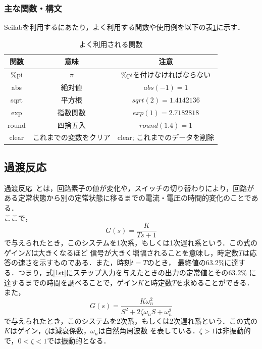 \documentclass[a4paper,11pt]{jsarticle}
\begin{document}
    \subsubsection{主な関数・構文}
    Scilabを利用するにあたり，よく利用する関数や使用例を以下の表\ref{tb:command}に示す．
    \begin{table}[H]
      \centering
      \caption{よく利用される関数}
      \label{tb:command}
      \begin{tabular}{|c|c|c|} \hline
        関数 & 意味 & 注意 \\ \hline 
        \%pi & $\pi$ & \%piを付けなければならない \\ \hline
        abs & 絶対値 & $abs(-1)=1$ \\ \hline
        sqrt & 平方根 & $sqrt(2)=1.4142136$ \\ \hline
        exp & 指数関数 & $exp(1)=2.7182818$ \\ \hline
        round & 四捨五入 & $round(1.4)=1$ \\ \hline
        clear & これまでの変数をクリア & clear; これまでのデータを削除 \\ \hline
      \end{tabular}
    \end{table}
  \subsection{過渡反応}
    過渡反応~\cite{kato}とは，回路素子の値が変化や，スイッチの切り替わりにより，回路が
    ある定常状態から別の定常状態に移るまでの電流・電圧の時間的変化のことである．\\
    ここで，\\
    \begin{equation}
      G(s) = \frac{K}{Ts + 1}
      \label{1st}
    \end{equation}
    で与えられたとき，このシステムを1次系，もしくは1次遅れ系という．この式のゲイン$K$は大きくなるほど
    信号が大きく増幅されることを意味し，時定数$T$は応答の速さを示すものである．また，時刻$t=T$のとき，
    最終値の$63.2\%$に達する．つまり，式\ref{1st}にステップ入力を与えたときの出力の定常値とその$63.2\%$
    に達するまでの時間を調べることで，ゲイン$K$と時定数$T$を求めることができる．\\
    また，\\
    \begin{equation}
      G(s) = \frac{K\omega_n^2}{S^2 + 2\zeta \omega_n S + \omega_n^2}
      \label{2nd}
    \end{equation}
    で与えられたとき，このシステムを2次系，もしくは2次遅れ系という．この式の$K$はゲイン，$\zeta$は減衰係数，$\omega_n$は自然角周波数
    を表している．$\zeta > 1$は非振動的で，$0 < \zeta < 1$では振動的となる．
\end{document}
